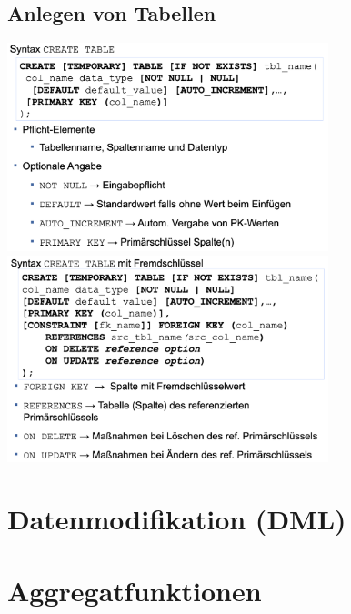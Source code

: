 \documentclass{scrreprt}
\begin{document}
\subsection{Anlegen von Tabellen}
\includegraphics[width=0.7\textwidth]{"graphics/anlage-tabelle"}
\\\includegraphics[width=0.7\textwidth]{"graphics/tabelle-fk"}
\section{Datenmodifikation (DML)}
\section{Aggregatfunktionen}
\end{document}
